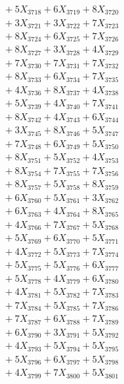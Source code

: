 \documentclass[a4paper,10pt]{article}
\begin{document}
{\begin{align}
&\;  + 5 X_{3718} + 6 X_{3719} + 8 X_{3720} \\[0.3ex]
&\;  + 3 X_{3721} + 3 X_{3722} + 7 X_{3723} \\[0.3ex]
&\;  + 8 X_{3724} + 6 X_{3725} + 7 X_{3726} \\[0.3ex]
&\;  + 8 X_{3727} + 3 X_{3728} + 4 X_{3729} \\[0.5ex]\allowbreak
&\;  + 7 X_{3730} + 7 X_{3731} + 7 X_{3732} \\[0.3ex]
&\;  + 8 X_{3733} + 6 X_{3734} + 7 X_{3735} \\[0.3ex]
&\;  + 4 X_{3736} + 8 X_{3737} + 4 X_{3738} \\[0.3ex]
&\;  + 5 X_{3739} + 4 X_{3740} + 7 X_{3741} \\[0.3ex]
&\;  + 8 X_{3742} + 4 X_{3743} + 6 X_{3744} \\[0.3ex]
&\;  + 3 X_{3745} + 8 X_{3746} + 5 X_{3747} \\[0.3ex]
&\;  + 7 X_{3748} + 6 X_{3749} + 5 X_{3750} \\[0.3ex]
&\;  + 8 X_{3751} + 5 X_{3752} + 4 X_{3753} \\[0.3ex]
&\;  + 8 X_{3754} + 7 X_{3755} + 7 X_{3756} \\[0.3ex]
&\;  + 8 X_{3757} + 5 X_{3758} + 8 X_{3759} \\[0.5ex]\allowbreak
&\;  + 6 X_{3760} + 5 X_{3761} + 3 X_{3762} \\[0.3ex]
&\;  + 6 X_{3763} + 4 X_{3764} + 8 X_{3765} \\[0.3ex]
&\;  + 4 X_{3766} + 7 X_{3767} + 5 X_{3768} \\[0.3ex]
&\;  + 5 X_{3769} + 6 X_{3770} + 5 X_{3771} \\[0.3ex]
&\;  + 4 X_{3772} + 5 X_{3773} + 7 X_{3774} \\[0.3ex]
&\;  + 5 X_{3775} + 5 X_{3776} + 6 X_{3777} \\[0.3ex]
&\;  + 5 X_{3778} + 4 X_{3779} + 6 X_{3780} \\[0.3ex]
&\;  + 4 X_{3781} + 5 X_{3782} + 7 X_{3783} \\[0.3ex]
&\;  + 7 X_{3784} + 5 X_{3785} + 7 X_{3786} \\[0.3ex]
&\;  + 7 X_{3787} + 6 X_{3788} + 7 X_{3789} \\[0.5ex]\allowbreak
&\;  + 6 X_{3790} + 3 X_{3791} + 5 X_{3792} \\[0.3ex]
&\;  + 4 X_{3793} + 5 X_{3794} + 5 X_{3795} \\[0.3ex]
&\;  + 5 X_{3796} + 6 X_{3797} + 5 X_{3798} \\[0.3ex]
&\;  + 4 X_{3799} + 7 X_{3800} + 5 X_{3801} \\[0.3ex]

\end{align}}
\end{document}
